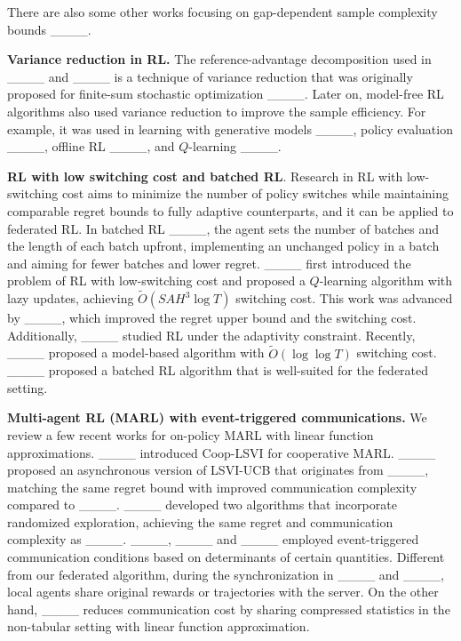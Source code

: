 There are also some other works focusing on gap-dependent sample complexity bounds
____.

\textbf{Variance reduction in RL.} The reference-advantage decomposition used in ____ and ____ is a technique of variance reduction that was originally proposed for finite-sum stochastic optimization  ____. Later on, model-free RL algorithms also used variance reduction to improve the sample efficiency. For example, it was used in learning with generative models ____, policy evaluation ____, offline RL ____, and $Q$-learning ____.

\textbf{RL with low switching cost and batched RL}. Research in RL with low-switching cost aims to minimize the number of policy switches while maintaining comparable regret bounds to fully adaptive counterparts, and it can be applied to federated RL. In batched RL ____, the agent sets the number of batches and the length of each batch upfront, implementing an unchanged policy in a batch and aiming for fewer batches and lower regret. ____ first introduced the problem of RL with low-switching cost and proposed a $Q$-learning algorithm with lazy updates, achieving $\tilde{O}(SAH^3\log T)$ switching cost. This work was advanced by ____, which improved the regret upper bound and the switching cost. Additionally, ____ studied RL under the adaptivity constraint. 
Recently, ____ proposed a model-based algorithm with $\tilde{O}(\log \log T)$ switching cost. ____ proposed a batched RL algorithm that is well-suited for the federated setting. 

\textbf{Multi-agent RL (MARL) with event-triggered communications.} We review a few recent works for on-policy MARL with linear function approximations. ____ introduced Coop-LSVI for cooperative MARL. ____ proposed an asynchronous version of LSVI-UCB that originates from ____, matching the same regret bound with improved communication complexity compared to ____. ____ developed two algorithms that incorporate randomized exploration, achieving the same regret and communication complexity as ____. ____, ____ and ____ employed event-triggered communication conditions based on determinants of certain quantities. Different from our federated algorithm, during the synchronization in ____ and ____, local agents share original rewards or trajectories with the server. On the other hand, ____ reduces communication cost by sharing compressed statistics in the non-tabular setting with linear function approximation.

